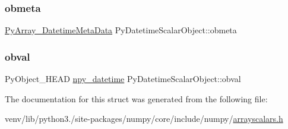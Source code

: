 \subsubsection{\texorpdfstring{obmeta}{obmeta}}
{\footnotesize\ttfamily \hyperlink{structPyArray__DatetimeMetaData}{Py\+Array\+\_\+\+Datetime\+Meta\+Data} Py\+Datetime\+Scalar\+Object\+::obmeta}

\mbox{\label{structPyDatetimeScalarObject_ab6f01dd90796ef8b7261ed646f7831cf}} 
\subsubsection{\texorpdfstring{obval}{obval}}
{\footnotesize\ttfamily Py\+Object\+\_\+\+H\+E\+AD \hyperlink{npy__common_8h_a346c4c4fa39422a1cb2137423d407bbb}{npy\+\_\+datetime} Py\+Datetime\+Scalar\+Object\+::obval}



The documentation for this struct was generated from the following file\+:\begin{DoxyCompactItemize}
\item 
venv/lib/python3./site-\/packages/numpy/core/include/numpy/\hyperlink{arrayscalars_8h}{arrayscalars.\+h}\end{DoxyCompactItemize}
